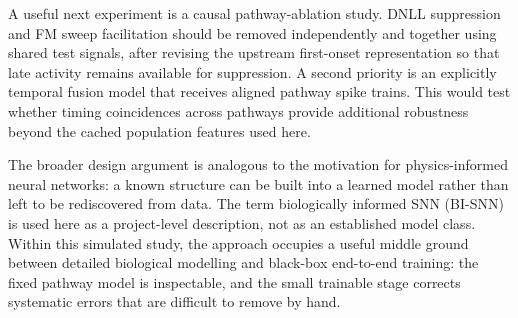 A useful next experiment is a causal pathway-ablation study. DNLL suppression and FM sweep facilitation should be removed independently and together using shared test signals, after revising the upstream first-onset representation so that late activity remains available for suppression. A second priority is an explicitly temporal fusion model that receives aligned pathway spike trains. This would test whether timing coincidences across pathways provide additional robustness beyond the cached population features used here.

The broader design argument is analogous to the motivation for physics-informed neural networks: a known structure can be built into a learned model rather than left to be rediscovered from data. The term biologically informed SNN (BI-SNN) is used here as a project-level description, not as an established model class. Within this simulated study, the approach occupies a useful middle ground between detailed biological modelling and black-box end-to-end training: the fixed pathway model is inspectable, and the small trainable stage corrects systematic errors that are difficult to remove by hand.
